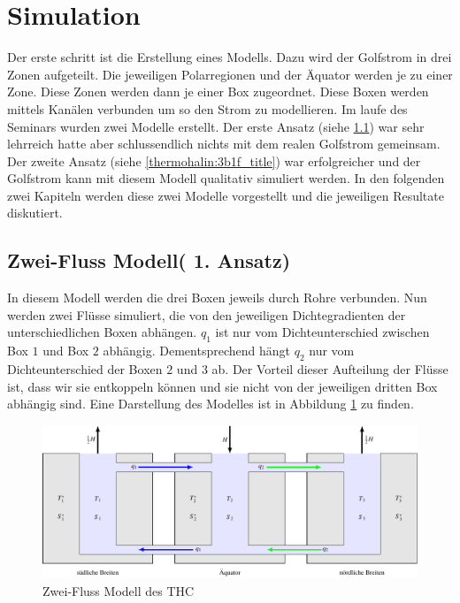 \section{Simulation}

Der erste schritt ist die Erstellung eines Modells.
Dazu wird der Golfstrom in drei Zonen aufgeteilt. Die jeweiligen Polarregionen und der Äquator werden je zu einer Zone. Diese Zonen werden dann je einer Box zugeordnet. Diese Boxen werden mittels Kanälen verbunden um so den Strom zu modellieren. 
Im laufe des Seminars wurden zwei Modelle erstellt. Der erste Ansatz (siehe \ref{thermohalin:3b2f_title}) war sehr lehrreich hatte aber schlussendlich nichts mit dem realen Golfstrom gemeinsam. Der zweite Ansatz (siehe \ref{thermohalin:3b1f_title}) war erfolgreicher und der Golfstrom kann mit diesem Modell qualitativ simuliert werden.
In den folgenden zwei Kapiteln werden diese zwei Modelle vorgestellt und die jeweiligen Resultate diskutiert.

\subsection{Zwei-Fluss Modell( 1. Ansatz)}\label{thermohalin:3b2f_title}

In diesem Modell werden die drei Boxen jeweils durch Rohre verbunden. Nun werden zwei Flüsse simuliert, die von den jeweiligen Dichtegradienten der unterschiedlichen Boxen abhängen. $q_1$ ist nur vom Dichteunterschied zwischen Box $1$ und Box $2$ abhängig. Dementsprechend hängt $q_2$ nur vom Dichteunterschied der Boxen $2$ und $3$ ab.
Der Vorteil dieser Aufteilung der Flüsse ist, dass wir sie entkoppeln können und sie nicht von der jeweiligen dritten Box abhängig sind.
Eine Darstellung des Modelles ist in Abbildung \ref{thermohalin:3b2f} zu finden.

\begin{figure}
	\centering
	\includegraphics[width=14cm]{thermohalin/tikz/3b2f.pdf}
	\caption{Zwei-Fluss Modell des THC}
		\label{thermohalin:3b2f}
\end{figure}

